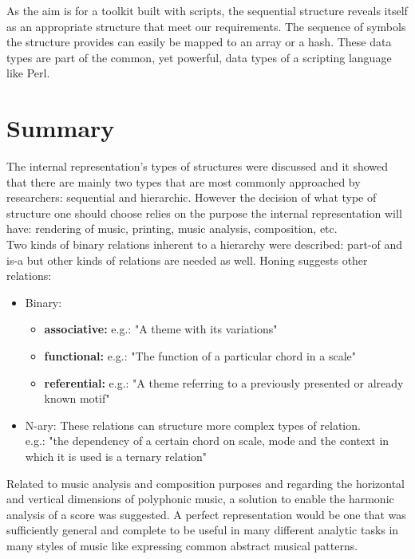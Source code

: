 \documentclass[main.tex]{files}
\begin{document}
As the aim is for a toolkit built with scripts, the sequential structure reveals itself as an
appropriate structure that meet our requirements. The sequence of symbols the structure provides can
easily be mapped to an array or a hash. These data types are part of the common, yet powerful, data
types of a scripting language like Perl.

\section{Summary} 

The internal representation's types of structures were discussed and it showed that there are mainly
two types that are most commonly approached by researchers: sequential and hierarchic. However the
decision of what type of structure one should choose relies on the purpose the internal
representation will have: rendering of music, printing, music analysis, composition, etc.\\

Two kinds of binary relations inherent to a hierarchy were described: part-of and is-a but other
kinds of relations are needed as well. Honing\cite{Honing1993} suggests other relations:
\begin{itemize}
  \item Binary:
    \begin{itemize}
      \item \textbf{associative:}
        e.g.: "A theme with its variations"
      \item \textbf{functional:}
        e.g.: "The function of a particular chord in a scale"
      \item \textbf{referential:}
        e.g.: "A theme referring to a previously presented or already known motif"
    \end{itemize}
  \item N-ary:
    These relations can structure more complex types of relation.\\
    e.g.: "the dependency of a certain chord on scale, mode and the context in which it is used is a
    ternary relation"
\end{itemize}

Related to music analysis and composition purposes and regarding the horizontal and vertical
dimensions of polyphonic music, a solution to enable the harmonic analysis of a score was suggested.
A perfect representation would be one that was sufficiently general and complete to be useful in
many different analytic tasks in many styles of music\cite{Honing1993} like expressing common
abstract musical patterns.\\
\end{document}
